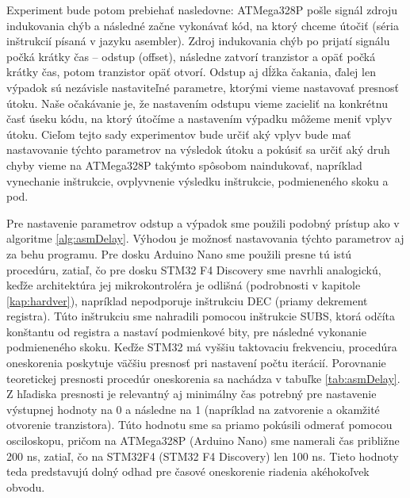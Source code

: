 Experiment bude potom prebiehať nasledovne: ATMega328P pošle signál zdroju indukovania chýb a následné začne vykonávať kód, na ktorý chceme útočiť (séria inštrukcií písaná v jazyku asembler). Zdroj indukovania chýb po prijatí signálu počká krátky čas -- odstup (offset), následne zatvorí tranzistor a opäť počká krátky čas, potom tranzistor opäť otvorí. Odstup aj dĺžka čakania, ďalej len výpadok sú nezávisle nastaviteľné parametre, ktorými vieme nastavovať presnosť útoku. Naše očakávanie je, že nastavením odstupu vieme zacieliť na konkrétnu časť úseku kódu, na ktorý útočíme a nastavením výpadku môžeme meniť vplyv útoku. Cieľom tejto sady experimentov bude určiť aký vplyv bude mať nastavovanie týchto parametrov na výsledok útoku a pokúsiť sa určiť aký druh chyby vieme na ATMega328P takýmto spôsobom naindukovať, napríklad vynechanie inštrukcie, ovplyvnenie výsledku inštrukcie, podmieneného skoku a pod.

Pre nastavenie parametrov odstup a výpadok sme použili podobný prístup ako v algoritme \ref{alg:asmDelay}. Výhodou je možnosť nastavovania týchto parametrov aj za behu programu. Pre dosku Arduino Nano sme použili presne tú istú procedúru, zatiaľ, čo pre dosku STM32 F4 Discovery sme navrhli analogickú, keďže architektúra jej mikrokontroléra je odlišná (podrobnosti v kapitole \ref{kap:hardver}), napríklad nepodporuje inštrukciu DEC (priamy dekrement registra). Túto inštrukciu sme nahradili pomocou inštrukcie SUBS, ktorá odčíta konštantu od registra a nastaví podmienkové bity, pre následné vykonanie podmieneného skoku. Keďže STM32 má vyššiu taktovaciu frekvenciu, procedúra oneskorenia poskytuje väčšiu presnosť pri nastavení počtu iterácií. Porovnanie teoretickej presnosti procedúr oneskorenia sa nachádza v tabuľke \ref{tab:asmDelay}. Z hľadiska presnosti je relevantný aj minimálny čas potrebný pre nastavenie výstupnej hodnoty na 0 a následne na 1 (napríklad na zatvorenie a okamžité otvorenie tranzistora). Túto hodnotu sme sa priamo pokúsili odmerať pomocou osciloskopu, pričom na ATMega328P (Arduino Nano) sme namerali čas približne 200 ns, zatiaľ, čo na STM32F4 (STM32 F4 Discovery) len 100 ns. Tieto hodnoty teda predstavujú dolný odhad pre časové oneskorenie riadenia akéhokoľvek obvodu.

